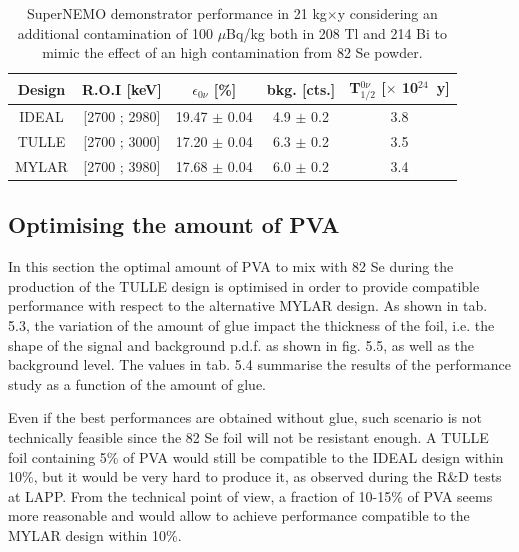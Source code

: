 \documentclass[main.tex]{subfiles}
\begin{document}
\begin{table}
\centering
\begin{tabular}{c|c|c|c|c}
\toprule
Design & R.O.I [keV] & $\epsilon_{\text{0}\nu}$ [\%] & bkg. [cts.] &   T$_{\text{1/2}}^{\text{0}\nu}$ [$\times$ 10$^{\text{24}}$~y] \\[0.1cm]
\hline
IDEAL           & [2700 ; 2980] & 19.47 $\pm$ 0.04 & 4.9 $\pm$ 0.2 & 3.8 \\  [0.1cm]
\hline
TULLE           & [2700 ; 3000] & 17.20 $\pm$ 0.04 & 6.3 $\pm$ 0.2 & 3.5 \\  [0.1cm]
\hline
MYLAR           & [2700 ; 3980] & 17.68 $\pm$ 0.04 & 6.0 $\pm$ 0.2 & 3.4 \\  [0.1cm]
\bottomrule
\end{tabular}
\caption{SuperNEMO demonstrator performance in 21 kg$\times$y considering an additional contamination of 100 $\mu$Bq/kg both in 208 Tl and 214 Bi to mimic the effect of an high contamination from 82 Se powder.}
\label{SNperformanceDiffDesign2}
\end{table}


\FloatBarrier


\subsection{Optimising the amount of PVA}


\NI In this section the optimal amount of PVA to mix with 82 Se during the production of the TULLE design is optimised in order to provide compatible performance with respect to the alternative MYLAR design. As shown in tab. 5.3, the variation of the amount of glue impact the thickness of the foil, i.e. the shape of the signal and background p.d.f. as shown in fig. 5.5, as well as the background level. The values in tab. 5.4 summarise the results of the performance study as a function of the amount of glue.


\bigskip


\NI Even if the best performances are obtained without glue, such scenario is not technically feasible since the 82 Se foil will not be resistant enough. A TULLE foil containing 5\% of PVA would still be compatible to the IDEAL design within 10\%, but it would be very hard to produce it, as observed during the R\&D tests at LAPP. From the technical point of view, a fraction of 10-15\% of PVA seems more reasonable and would allow to achieve performance compatible to the MYLAR design within 10\%.
\end{document}

